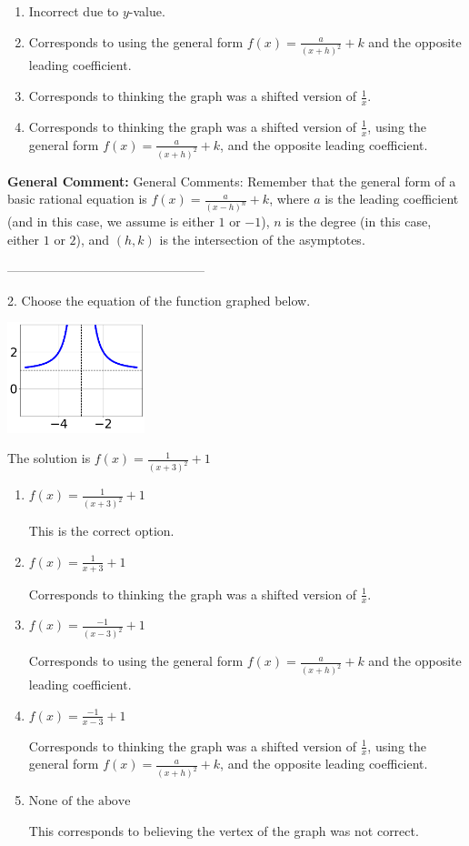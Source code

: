 \documentclass{extbook}[14pt]
\begin{document}
\begin{enumerate}[label=\Alph*.] 
\item Incorrect due to $y$-value.  
\item Corresponds to using the general form $f(x) = \frac{a}{(x+h)^2}+k$ and the opposite leading coefficient.  
\item Corresponds to thinking the graph was a shifted version of $\frac{1}{x}$.  
\item Corresponds to thinking the graph was a shifted version of $\frac{1}{x}$, using the general form $f(x) = \frac{a}{(x+h)^2}+k$, and the opposite leading coefficient.  
\end{enumerate} 
 
\textbf{General Comment:} General Comments: Remember that the general form of a basic rational equation is $ f(x) = \frac{a}{(x-h)^n} + k$, where $a$ is the leading coefficient (and in this case, we assume is either $1$ or $-1$), $n$ is the degree (in this case, either $1$ or $2$), and $(h, k)$ is the intersection of the asymptotes. 

-----------------------------------------------

2. Choose the equation of the function graphed below.
\begin{center} \includegraphics[width=0.3\textwidth]{../Figures/rationalGraphToEquationC.png} \end{center} 

The solution is $ f(x) = \frac{1}{(x + 3)^2} + 1 $ 

\begin{enumerate}[label=\Alph*.] 
\item $ f(x) = \frac{1}{(x + 3)^2} + 1 $ 

 This is the correct option. 
\item $ f(x) = \frac{1}{x + 3} + 1 $ 

 Corresponds to thinking the graph was a shifted version of $\frac{1}{x}$. 
\item $ f(x) = \frac{-1}{(x - 3)^2} + 1 $ 

 Corresponds to using the general form $f(x) = \frac{a}{(x+h)^2}+k$ and the opposite leading coefficient. 
\item $ f(x) = \frac{-1}{x - 3} + 1 $ 

 Corresponds to thinking the graph was a shifted version of $\frac{1}{x}$, using the general form $f(x) = \frac{a}{(x+h)^2}+k$, and the opposite leading coefficient. 
\item $ \text{None of the above} $ 

 This corresponds to believing the vertex of the graph was not correct. 
\end{enumerate} 
 
\end{document}
